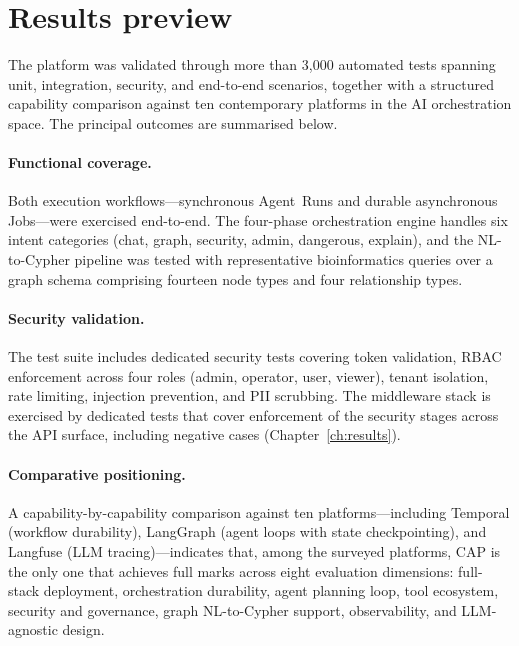 \documentclass[a4paper]{sapthesis}
\begin{document}
\section{Results preview}
\label{sec:results-preview}

The platform was validated through more than 3{,}000 automated tests
spanning unit, integration, security, and end-to-end scenarios, together
with a structured capability comparison against ten contemporary platforms
in the AI orchestration space.  The principal outcomes are summarised below.

\paragraph{Functional coverage.}
Both execution workflows---synchronous Agent~Runs and durable
asynchronous Jobs---were exercised end-to-end.  The four-phase
orchestration engine handles six intent categories (chat, graph,
security, admin, dangerous, explain), and the NL-to-Cypher pipeline
was tested with representative bioinformatics queries over a graph
schema comprising fourteen node types and four relationship types.

\paragraph{Security validation.}
The test suite includes dedicated security tests covering token
validation, RBAC enforcement across four roles (admin, operator, user,
viewer), tenant isolation, rate limiting, injection prevention, and PII
scrubbing.  The middleware stack is exercised by dedicated tests
that cover enforcement of the security stages across the API surface,
including negative cases (Chapter~\ref{ch:results}).

\paragraph{Comparative positioning.}
A capability-by-capability comparison against ten platforms---including
Temporal (workflow durability), LangGraph (agent loops with state
checkpointing), and Langfuse (LLM tracing)---indicates that, among the
surveyed platforms, CAP is the only one that achieves full marks across
eight evaluation dimensions: full-stack deployment, orchestration
durability, agent planning loop, tool ecosystem, security and governance,
graph NL-to-Cypher support, observability, and LLM-agnostic design.
\end{document}
